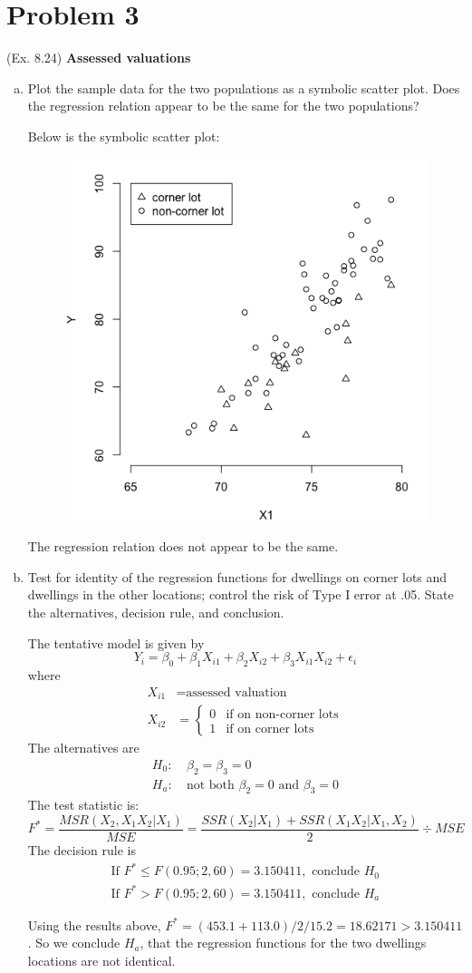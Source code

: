 \documentclass[10pt]{report}
\begin{document}
\section*{Problem 3}
(Ex. 8.24) \textbf{Assessed valuations}
\begin{enumerate}[a.]
	\item 
	Plot the sample data for the two populations as a symbolic scatter plot. Does the regression relation appear to be the same for the two populations?
	
	Below is the symbolic scatter plot:
	\begin{figure}[H]
		\centering
		\includegraphics[width=.5\linewidth]{p3/24a.png}
	\end{figure}
	The regression relation does not appear to be the same.
	
	\item 
	Test for identity of the regression functions for dwellings on corner lots and dwellings in the other locations; control the risk of Type I error at .05. State the alternatives, decision rule, and conclusion.
	
	The tentative model is given by
	\[
	Y_i = \beta_0 + \beta_1 X_{i1} + \beta_2 X_{i2} + \beta_3 X_{i1}X_{i2} + \epsilon_i
	\]
	where
	\begin{align*}
		X_{i1} &= \text{assessed valuation}\\
		X_{i2} &=
		\begin{cases}
		0 & \text{if on non-corner lots}\\
		1 & \text{if on corner lots}
		\end{cases}
	\end{align*}
	The alternatives are
	\begin{align*}
		H_0: &\ \beta_2 = \beta_3 = 0\\
		H_a: &\ \text{not both $\beta_2 = 0$ and $\beta_3 = 0$}
	\end{align*}
	The test statistic is:
	\[
	F^* = \frac{MSR(X_2, X_1 X_2 | X_1)}{MSE} = \frac{SSR(X_2 | X_1) + SSR(X_1 X_2 | X_1, X_2)}{2} \div MSE
	\]
	The decision rule is
	\begin{align*}
	\text{If } F^* \le F(0.95; 2, 60) = 3.150411, \text{ conclude } H_0\\
	\text{If } F^* > F(0.95; 2, 60) = 3.150411, \text{ conclude } H_a
	\end{align*}
	
	Using the results above, $F^* = (453.1+113.0)/2/15.2 = 18.62171 > 3.150411$. So we conclude $H_a$, that the regression functions for the two dwellings locations are not identical.
	

\end{enumerate}
\end{document}
